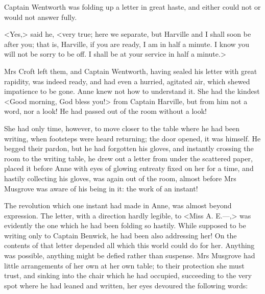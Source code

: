 Captain Wentworth was folding up a letter in great haste, and either could not or would not answer fully.

<Yes,> said he, <very true; here we separate, but Harville and I shall soon be after you; that is, Harville, if you are ready, I am in half a minute. I know you will not be sorry to be off. I shall be at your service in half a minute.>

Mrs Croft left them, and Captain Wentworth, having sealed his letter with great rapidity, was indeed ready, and had even a hurried, agitated air, which shewed impatience to be gone. Anne knew not how to understand it. She had the kindest <Good morning, God bless you!> from Captain Harville, but from him not a word, nor a look! He had passed out of the room without a look!

She had only time, however, to move closer to the table where he had been writing, when footsteps were heard returning; the door opened, it was himself. He begged their pardon, but he had forgotten his gloves, and instantly crossing the room to the writing table, he drew out a letter from under the scattered paper, placed it before Anne with eyes of glowing entreaty fixed on her for a time, and hastily collecting his gloves, was again out of the room, almost before Mrs Musgrove was aware of his being in it: the work of an instant!

The revolution which one instant had made in Anne, was almost beyond expression. The letter, with a direction hardly legible, to <Miss A\@. E\@.—,> was evidently the one which he had been folding so hastily. While supposed to be writing only to Captain Benwick, he had been also addressing her! On the contents of that letter depended all which this world could do for her. Anything was possible, anything might be defied rather than suspense. Mrs Musgrove had little arrangements of her own at her own table; to their protection she must trust, and sinking into the chair which he had occupied, succeeding to the very spot where he had leaned and written, her eyes devoured the following words:

